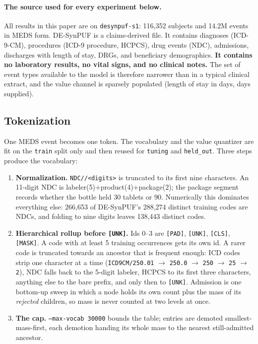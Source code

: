 \documentclass[11pt,a4paper]{article}
\newcommand{\code}[1]{\texttt{\small #1}}
\begin{document}
\paragraph{The source used for every experiment below.}
All results in this paper are on \code{desynpuf-s1}: 116{,}352 subjects and
14.2M events in MEDS form. DE-SynPUF is a claims-derived file. It contains
diagnoses (ICD-9-CM), procedures (ICD-9 procedure, HCPCS), drug events (NDC),
admissions, discharges with length of stay, DRGs, and beneficiary
demographics. \textbf{It contains no laboratory results, no vital signs, and no
clinical notes.} The set of event types available to the model is therefore
narrower than in a typical clinical extract, and the value channel is sparsely
populated (length of stay in days, days supplied).

\subsection{Tokenization}

One MEDS event becomes one token. The vocabulary and the value quantizer are
fit on the \code{train} split only and then reused for \code{tuning} and
\code{held\_out}. Three steps produce the vocabulary:

\begin{enumerate}[leftmargin=*,itemsep=2pt,topsep=3pt]
\item \textbf{Normalization.} \code{NDC//\textless digits\textgreater} is
      truncated to its first nine characters. An 11-digit NDC is
      labeler(5)+product(4)+package(2); the package segment records whether the
      bottle held 30 tablets or 90. Numerically this dominates everything else:
      266{,}653 of DE-SynPUF's 288{,}274 distinct training codes are NDCs, and
      folding to nine digits leaves 138{,}443 distinct codes.
\item \textbf{Hierarchical rollup before \code{[UNK]}.} Ids 0--3 are
      \code{[PAD]}, \code{[UNK]}, \code{[CLS]}, \code{[MASK]}. A code with at
      least 5 training occurrences gets its own id. A rarer code is truncated
      towards an ancestor that is frequent enough: ICD codes strip one
      character at a time (\code{ICD9CM/250.01} $\to$ \code{250.0} $\to$
      \code{250} $\to$ \code{25} $\to$ \code{2}), NDC falls back to the 5-digit
      labeler, HCPCS to its first three characters, anything else to the bare
      prefix, and only then to \code{[UNK]}. Admission is one bottom-up sweep
      in which a node holds its own count plus the mass of its \emph{rejected}
      children, so mass is never counted at two levels at once.
\item \textbf{The cap.} \code{--max-vocab 30000} bounds the table; entries are
      demoted smallest-mass-first, each demotion handing its whole mass to the
      nearest still-admitted ancestor.
\end{enumerate}
\end{document}
